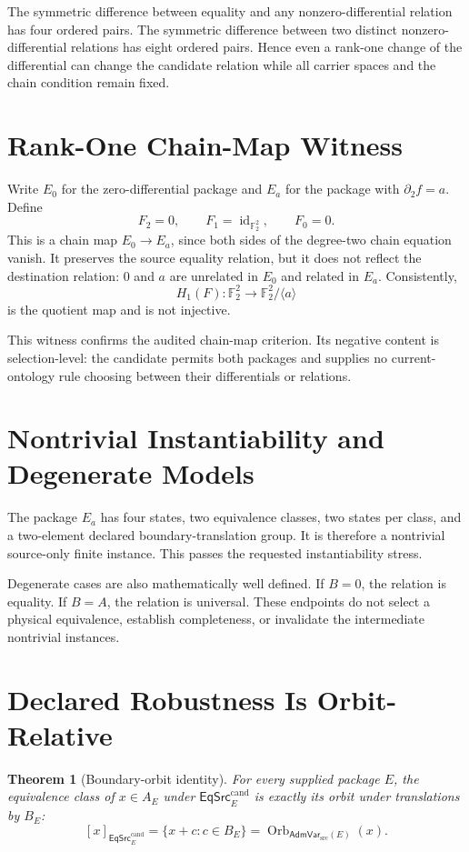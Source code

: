 \documentclass[11pt]{article}
\newtheorem{theorem}{Theorem}
\newcommand{\Ftwo}{\mathbb F_2}
\newcommand{\EqCand}{\mathsf{EqSrc}^{\mathrm{cand}}}
\newcommand{\AdmVar}{\mathsf{AdmVar}_{\mathrm{src}}}
\begin{document}
The symmetric difference between equality and any nonzero-differential
relation has four ordered pairs. The symmetric difference between two
distinct nonzero-differential relations has eight ordered pairs. Hence even a
rank-one change of the differential can change the candidate relation while
all carrier spaces and the chain condition remain fixed.

\section{Rank-One Chain-Map Witness}

Write \(E_0\) for the zero-differential package and \(E_a\) for the package
with \(\partial_2f=a\). Define
\[
 F_2=0,\qquad F_1=\operatorname{id}_{\Ftwo^2},\qquad F_0=0.
\]
This is a chain map \(E_0\to E_a\), since both sides of the degree-two chain
equation vanish. It preserves the source equality relation, but it does not
reflect the destination relation: \(0\) and \(a\) are unrelated in \(E_0\)
and related in \(E_a\). Consistently,
\[
 H_1(F):\Ftwo^2\longrightarrow \Ftwo^2/\langle a\rangle
\]
is the quotient map and is not injective.

This witness confirms the audited chain-map criterion. Its negative content is
selection-level: the candidate permits both packages and supplies no
current-ontology rule choosing between their differentials or relations.

\section{Nontrivial Instantiability and Degenerate Models}

The package \(E_a\) has four states, two equivalence classes, two states per
class, and a two-element declared boundary-translation group. It is therefore
a nontrivial source-only finite instance. This passes the requested
instantiability stress.

Degenerate cases are also mathematically well defined. If \(B=0\), the
relation is equality. If \(B=A\), the relation is universal. These endpoints
do not select a physical equivalence, establish completeness, or invalidate
the intermediate nontrivial instances.

\section{Declared Robustness Is Orbit-Relative}

\begin{theorem}[Boundary-orbit identity]
For every supplied package \(E\), the equivalence class of \(x\in A_E\) under
\(\EqCand_E\) is exactly its orbit under translations by \(B_E\):
\[
 [x]_{\EqCand_E}
 =\{x+c:c\in B_E\}
 =\operatorname{Orb}_{\AdmVar(E)}(x).
\]
\end{theorem}
\end{document}
